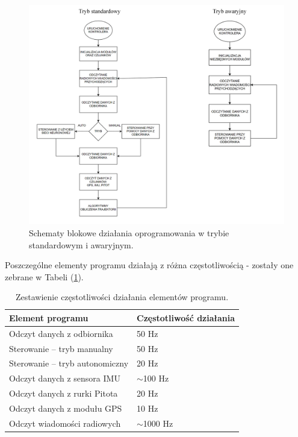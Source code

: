 \documentclass[12pt, a4paper]{article}
\let\oldref\ref
\renewcommand{\ref}[1]{(\oldref{#1})}
\begin{document}
\begin{figure}[ht]
    \centering
    \includegraphics[width=1\textwidth]{diagramy}
    \caption{Schematy blokowe działania oprogramowania w trybie standardowym i awaryjnym.}
\end{figure}

Poszczególne elementy programu działają z różna częstotliwością - zostały one zebrane w Tabeli \ref{table:hz}.


\begin{table}[H]
\centering
\begin{tabular}{| l | l |}
\hline
Element programu & Częstotliwość działania \\
\hline
Odczyt danych z odbiornika & 50 Hz \\
Sterowanie – tryb manualny & 50 Hz \\
Sterowanie – tryb autonomiczny & 20 Hz \\
Odczyt danych z sensora IMU & $\sim$100 Hz \\
Odczyt danych z rurki Pitota & 20 Hz \\
Odczyt danych z modułu GPS & 10 Hz \\
Odczyt wiadomości radiowych & $\sim$1000 Hz \\
\hline

\end{tabular}
\caption{Zestawienie częstotliwości działania elementów programu.}
\label{table:hz}
\end{table}
\end{document}
